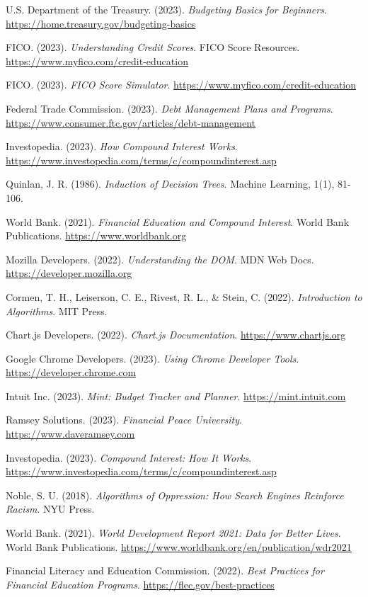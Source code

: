 \documentclass[11pt,twocolumn]{article}
\begin{document}
\begin{thebibliography}{9}

U.S. Department of the Treasury. (2023). 
\textit{Budgeting Basics for Beginners}. 
\url{https://home.treasury.gov/budgeting-basics}

FICO. (2023). 
\textit{Understanding Credit Scores}. 
FICO Score Resources. 
\url{https://www.myfico.com/credit-education}

FICO. (2023). 
\textit{FICO Score Simulator}. 
\url{https://www.myfico.com/credit-education}

Federal Trade Commission. (2023). 
\textit{Debt Management Plans and Programs}. 
\url{https://www.consumer.ftc.gov/articles/debt-management}


Investopedia. (2023). 
\textit{How Compound Interest Works}. 
\url{https://www.investopedia.com/terms/c/compoundinterest.asp}

Quinlan, J. R. (1986). 
\textit{Induction of Decision Trees}. 
Machine Learning, 1(1), 81-106.

World Bank. (2021). 
\textit{Financial Education and Compound Interest}. 
World Bank Publications. 
\url{https://www.worldbank.org}

Mozilla Developers. (2022). 
\textit{Understanding the DOM}. 
MDN Web Docs. 
\url{https://developer.mozilla.org}

Cormen, T. H., Leiserson, C. E., Rivest, R. L., \& Stein, C. (2022). 
\textit{Introduction to Algorithms}. 
MIT Press.

Chart.js Developers. (2022). 
\textit{Chart.js Documentation}. 
\url{https://www.chartjs.org}

Google Chrome Developers. (2023). 
\textit{Using Chrome Developer Tools}. 
\url{https://developer.chrome.com}

Intuit Inc. (2023). 
\textit{Mint: Budget Tracker and Planner}. 
\url{https://mint.intuit.com}

Ramsey Solutions. (2023). 
\textit{Financial Peace University}. 
\url{https://www.daveramsey.com}

Investopedia. (2023). 
\textit{Compound Interest: How It Works}. 
\url{https://www.investopedia.com/terms/c/compoundinterest.asp}

Noble, S. U. (2018). 
\textit{Algorithms of Oppression: How Search Engines Reinforce Racism}. 
NYU Press.

World Bank. (2021). 
\textit{World Development Report 2021: Data for Better Lives}. 
World Bank Publications. 
\url{https://www.worldbank.org/en/publication/wdr2021}

Financial Literacy and Education Commission. (2022). 
\textit{Best Practices for Financial Education Programs}. 
\url{https://flec.gov/best-practices}
\end{thebibliography}
\end{document}
